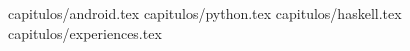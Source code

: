\documentclass[letterpaper,12pt,twoside,spanish]{book}
\begin{document}


\maketitle												%

\mbox{}
\newpage


 {capitulos/android.tex}				%
 {capitulos/python.tex}				%
 {capitulos/haskell.tex}				%
 {capitulos/experiences.tex}			%


\end{document}

